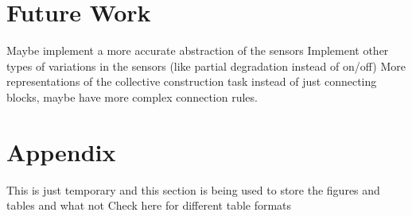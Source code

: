 \documentclass[conference]{IEEEtran}
\begin{document}
\section{Future Work}
Maybe implement a more accurate abstraction of the sensors
Implement other types of variations in the sensors (like partial degradation instead of on/off)
More representations of the collective construction task instead of just connecting blocks, maybe have more complex connection rules.




\section{Appendix}
This is just temporary and this section is being used to store the figures and tables and what not 
Check here for different table formats
\end{document}
